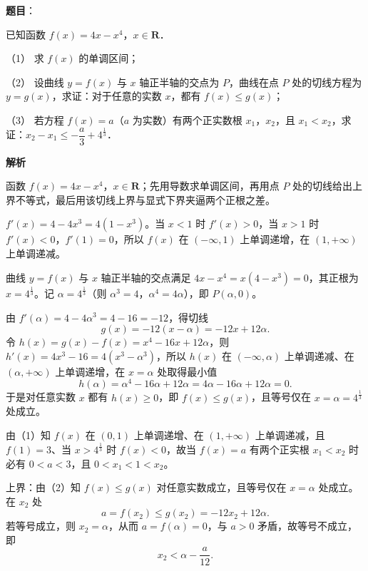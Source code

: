 \begin{answer}

\textbf{题目}：

已知函数 \(f(x)=4x-x^4\)，\(x\in\mathbf{R}\)．

（1） 求 \(f(x)\) 的单调区间；

（2） 设曲线 \(y=f(x)\) 与 \(x\) 轴正半轴的交点为 \(P\)，曲线在点 \(P\) 处的切线方程为 \(y=g(x)\)，求证：对于任意的实数 \(x\)，都有 \(f(x)\leqslant g(x)\)；

（3） 若方程 \(f(x)=a\)（\(a\) 为实数）有两个正实数根 \(x_1\)，\(x_2\)，且 \(x_1<x_2\)，求证：\(x_2-x_1\leqslant-\dfrac{a}{3}+4^{\frac{1}{3}}\)．

\textbf{解析}

函数 \(f(x)=4x-x^{4}\)，\(x\in\mathbf{R}\)；先用导数求单调区间，再用点 \(P\) 处的切线给出上界不等式，最后用该切线上界与显式下界夹逼两个正根之差。

\(f'(x)=4-4x^{3}=4(1-x^{3})\)。当 \(x<1\) 时 \(f'(x)>0\)，当 \(x>1\) 时 \(f'(x)<0\)，\(f'(1)=0\)，所以 \(f(x)\) 在 \((-\infty,1)\) 上单调递增，在 \((1,+\infty)\) 上单调递减。

曲线 \(y=f(x)\) 与 \(x\) 轴正半轴的交点满足 \(4x-x^{4}=x(4-x^{3})=0\)，其正根为 \(x=4^{\frac{1}{3}}\)。记 \(\alpha=4^{\frac{1}{3}}\)（则 \(\alpha^{3}=4\)，\(\alpha^{4}=4\alpha\)），即 \(P(\alpha,0)\)。

由 \(f'(\alpha)=4-4\alpha^{3}=4-16=-12\)，得切线
\nopagebreak[4]
\[
g(x)=-12(x-\alpha)=-12x+12\alpha.
\]
令 \(h(x)=g(x)-f(x)=x^{4}-16x+12\alpha\)，则 \(h'(x)=4x^{3}-16=4(x^{3}-\alpha^{3})\)，所以 \(h(x)\) 在 \((-\infty,\alpha)\) 上单调递减、在 \((\alpha,+\infty)\) 上单调递增，在 \(x=\alpha\) 处取得最小值
\nopagebreak[4]
\[
h(\alpha)=\alpha^{4}-16\alpha+12\alpha=4\alpha-16\alpha+12\alpha=0.
\]
于是对任意实数 \(x\) 都有 \(h(x)\geqslant 0\)，即 \(f(x)\leqslant g(x)\)，且等号仅在 \(x=\alpha=4^{\frac{1}{3}}\) 处成立。

由（1）知 \(f(x)\) 在 \((0,1)\) 上单调递增、在 \((1,+\infty)\) 上单调递减，且 \(f(1)=3\)、当 \(x>4^{\frac{1}{3}}\) 时 \(f(x)<0\)，故当 \(f(x)=a\) 有两个正实根 \(x_1<x_2\) 时必有 \(0<a<3\)，且 \(0<x_1<1<x_2\)。

上界：由（2）知 \(f(x)\leqslant g(x)\) 对任意实数成立，且等号仅在 \(x=\alpha\) 处成立。在 \(x_2\) 处
\nopagebreak[4]
\[
a=f(x_2)\leqslant g(x_2)=-12x_2+12\alpha.
\]
若等号成立，则 \(x_2=\alpha\)，从而 \(a=f(\alpha)=0\)，与 \(a>0\) 矛盾，故等号不成立，即
\nopagebreak[4]
\[
x_2<\alpha-\dfrac{a}{12}.
\]


\end{answer}
